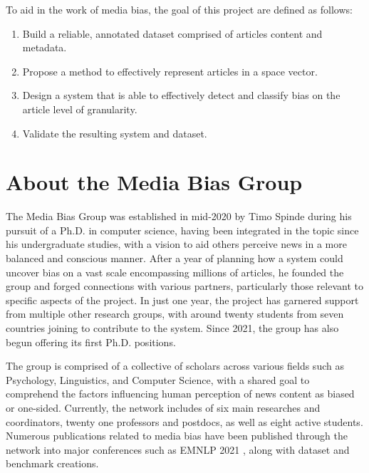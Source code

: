 To aid in the work of media bias, the goal of this project are defined as follows:
\begin{enumerate}
    \item Build a reliable, annotated dataset comprised of articles content and metadata.
    \item Propose a method to effectively represent articles in a space vector.
    \item Design a system that is able to effectively detect and classify bias on the article level of granularity.
    \item Validate the resulting system and dataset.
\end{enumerate}

\section{About the Media Bias Group}

The Media Bias Group \cite{media-bias-group} was established in mid-2020 by Timo Spinde during his pursuit of a Ph.D. in computer science, having been integrated in the topic since his undergraduate studies, with a vision to aid others perceive news in a more balanced and conscious manner. After a year of planning how a system could uncover bias on a vast scale encompassing millions of articles, he founded the group and forged connections with various partners, particularly those relevant to specific aspects of the project. In just one year, the project has garnered support from multiple other research groups, with around twenty students from seven countries joining to contribute to the system. Since 2021, the group has also begun offering its first Ph.D. positions.

The group is comprised of a collective of scholars across various fields such as Psychology, Linguistics, and Computer Science, with a shared goal to comprehend the factors influencing human perception of news content as biased or one-sided. Currently, the network includes of six main researches and coordinators, twenty one professors and postdocs, as well as eight active students. Numerous publications related to media bias have been published through the network into major conferences such as EMNLP 2021 \cite{spinde-2021-babe}, along with dataset and benchmark creations.


